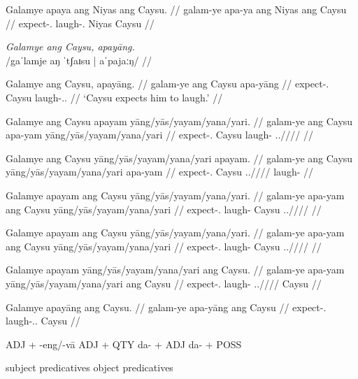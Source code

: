 \documentclass[12pt,a4paper]{scrartcl}
\newcommand{\TsgM}{{\Tsg}.{\M}}
\newcommand{\TsgF}{{\Tsg}.{\F}}
\begin{document}
\a\ljudge*\begingl
\gla Galamye apaya ang Niyas ang Caysu. //
\glb galam-ye apa-ya ang Niyas ang Caysu //
\glc expect-\TsgF{} laugh-\TsgM{} \Aarg{} Niyas \Aarg{} Caysu //
\endgl

\xe

\pex
\a\begingl
\glpreamble \textit{Galamye ang Caysu, apayāng.} \\
	/gaˈlamje aŋ ˈtʃaɪsu | aˈpajaːŋ/ //

\gla Galamye ang Caysu, apayāng. //
\glb galam-ye ang Caysu apa-yāng //
\glc expect-\TsgF{} \Aarg{} Caysu laugh-\TsgM{}.\Aarg{} //
\glft `Caysu expects him to laugh.' //
\endgl

\a\ljudge*\begingl
\gla Galamye ang Caysu apayam yāng/yās/yayam/yana/yari. //
\glb galam-ye ang Caysu apa-yam yāng/yās/yayam/yana/yari //
\glc expect-\TsgF{} \Aarg{} Caysu laugh-\Ptcp{} \TsgM{}.\Aarg{}/\Parg{}/\Dat{}/\Gen{}/\Ins{} //
\endgl

\a\ljudge*\begingl
\gla Galamye ang Caysu yāng/yās/yayam/yana/yari apayam. //
\glb galam-ye ang Caysu yāng/yās/yayam/yana/yari apa-yam //
\glc expect-\TsgF{} \Aarg{} Caysu \TsgM{}.\Aarg{}/\Parg{}/\Dat{}/\Gen{}/\Ins{} laugh-\Ptcp{} //
\endgl

\a\ljudge*\begingl
\gla Galamye apayam ang Caysu yāng/yās/yayam/yana/yari. //
\glb galam-ye apa-yam ang Caysu yāng/yās/yayam/yana/yari //
\glc expect-\TsgF{} laugh-\Ptcp{} \Aarg{} Caysu \TsgM{}.\Aarg{}/\Parg{}/\Dat{}/\Gen{}/\Ins{} //
\endgl

\a\ljudge*\begingl
\gla Galamye apayam ang Caysu yāng/yās/yayam/yana/yari. //
\glb galam-ye apa-yam ang Caysu yāng/yās/yayam/yana/yari //
\glc expect-\TsgF{} laugh-\Ptcp{} \Aarg{} Caysu \TsgM{}.\Aarg{}/\Parg{}/\Dat{}/\Gen{}/\Ins{} //
\endgl

\a\ljudge*\begingl
\gla Galamye apayam yāng/yās/yayam/yana/yari ang Caysu. //
\glb galam-ye apa-yam yāng/yās/yayam/yana/yari ang Caysu //
\glc expect-\TsgF{} laugh-\Ptcp{} \TsgM{}.\Aarg{}/\Parg{}/\Dat{}/\Gen{}/\Ins{} \Aarg{} Caysu //
\endgl

\a\ljudge*\begingl
\gla Galamye apayāng ang Caysu. //
\glb galam-ye apa-yāng ang Caysu //
\glc expect-\TsgF{} laugh-\TsgM{}.\Aarg{} \Aarg{} Caysu //
\endgl

\xe

\ex ADJ + -eng/-vā \xe
\ex ADJ + QTY \xe
\ex da- + ADJ \xe
\ex da- + POSS \xe

\ex subject predicatives \xe
\ex object predicatives \xe

\vfill

\begin{multicols}{2}
\printglossary[style=mysuper,type=\leipzigtype]
\end{multicols}
\end{document}
